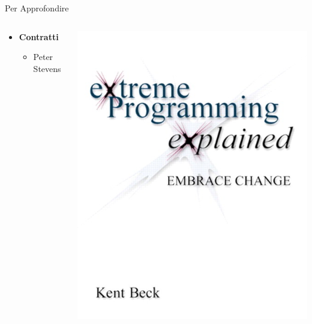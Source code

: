 \begin{frame}{Per Approfondire}
\begin{columns}[T]
\begin{column}{.8\textwidth}
\begin{itemize}
					\item \textbf{Contratti}
						\begin{itemize}
							\item {\small Peter Stevens }
						\end{itemize}
				\end{itemize}
			\end{column}
			\begin{column}{.2\textwidth}
				\vspace*{-0.4cm}
				\hspace*{0.05cm} \includegraphics[scale=0.09]{images/book-1} \\
				\vspace*{0.05cm}

\end{column}
\end{columns}
\end{frame}

